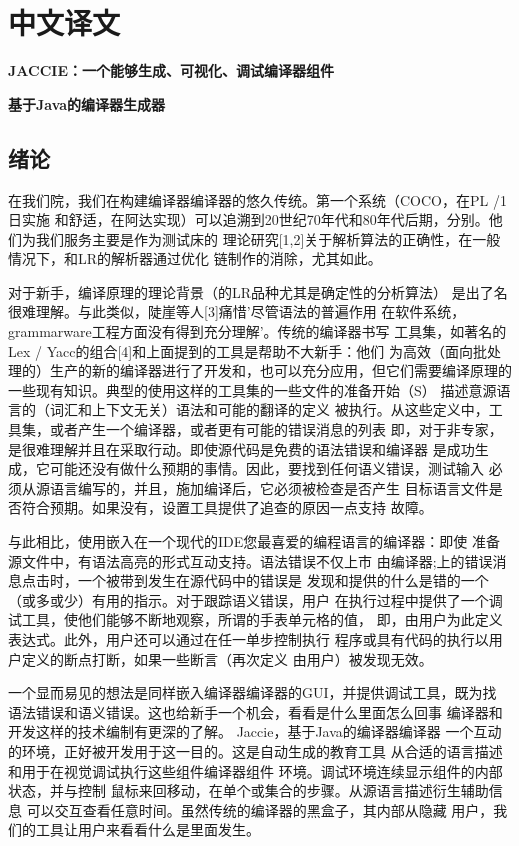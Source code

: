 \section{中文译文}
\centerline{\textbf{\huge{\hei {} JACCIE：一个能够生成、可视化、调试编译器组件}}}
\centerline{\textbf{\huge{\hei {} 基于Java的编译器生成器}}}
\subsection{绪论}
在我们院，我们在构建编译器编译器的悠久传统。第一个系统（COCO，在PL /1日实施
和舒适，在阿达实现）可以追溯到20世纪70年代和80年代后期，分别。他们为我们服务主要是作为测试床的
理论研究[1,2]关于解析算法的正确性，在一般情况下，和LR的解析器通过优化
链制作的消除，尤其如此。

对于新手，​​编译原理的理论背景（的LR品种尤其是确定性的分析算法）
是出了名很难理解。与此类似，陡崖等人[3]痛惜'尽管语法的普遍作用
在软件系统，grammarware工程方面没有得到充分理解'。传统的编译器书写
工具集，如著名的Lex / Yacc的组合[4]和上面提到的工具是帮助不大新手：他们
为高效（面向批处理的）生产的新的编译器进行了开发和，也可以充分应用，但它们需要编译原理的一些现有知识。典型的使用这样的工具集的一些文件的准备开始（S）
描述意源语言的（词汇和上下文无关）语法和可能的翻译的定义
被执行。从这些定义中，工具集，或者产生一个编译器，或者更有可能的错误消息的列表
即，对于非专家，是很难理解并且在采取行动。即使源代码是免费的语法错误和编译器
是成功生成，它可能还没有做什么预期的事情。因此，要找到任何语义错误，测试输入
必须从源语言编写的，并且，施加编译后，它必须被检查是否产生
目标语言文件是否符合预期。如果没有，设置工具提供了追查的原因一点支持
故障。

与此相比，使用嵌入在一个现代的IDE您最喜爱的编程语言的编译器：即使
准备源文件中，有语法高亮的形式互动支持。语法错误不仅上市
由编译器;上的错误消息点击时，一个被带到发生在源代码中的错误是
发现和提供的什么是错的一个（或多或少）有用的指示。对于跟踪语义错误，用户
在执行过程中提供了一个调试工具，使他们能够不断地观察，所谓的手表单元格的值，
即，由用户为此定义表达式。此外，用户还可以通过在任一单步控制执行
程序或具有代码的执行以用户定义的断点打断，如果一些断言（再次定义
由用户）被发现无效。

一个显而易见的想法是同样嵌入编译器编译器的GUI，并提供调试工具，既为找
语法错误和语义错误。这也给新手一个机会，看看是什么里面怎么回事
编译器和开发这样的技术编制有更深的了解。 Jaccie，基于Java的编译器编译器
一个互动的环境，正好被开发用于这一目的。这是自动生成的教育工具
从合适的语言描述和用于在视觉调试执行这些组件编译器组件
环境。调试环境连续显示组件的内部状态，并与控制
鼠标来回移动，在单个或集合的步骤。从源语言描述衍生辅助信息
可以交互查看任意时间。虽然传统的编译器的黑盒子，其内部从隐藏
用户，我们的工具让用户来看看什么是里面发生。

